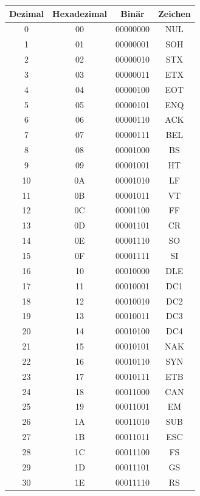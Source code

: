 \begin{table}[H]
    \centering
    \tiny
    \begin{tabular}{cccc}
        \toprule
        Dezimal & Hexadezimal & Binär & Zeichen \\
        \midrule
        0 & 00 & 00000000 & NUL \\
        1 & 01 & 00000001 & SOH \\
        2 & 02 & 00000010 & STX \\
        3 & 03 & 00000011 & ETX \\
        4 & 04 & 00000100 & EOT \\
        5 & 05 & 00000101 & ENQ \\
        6 & 06 & 00000110 & ACK \\
        7 & 07 & 00000111 & BEL \\
        8 & 08 & 00001000 & BS \\
        9 & 09 & 00001001 & HT \\
        10 & 0A & 00001010 & LF \\
        11 & 0B & 00001011 & VT \\
        12 & 0C & 00001100 & FF \\
        13 & 0D & 00001101 & CR \\
        14 & 0E & 00001110 & SO \\
        15 & 0F & 00001111 & SI \\
        16 & 10 & 00010000 & DLE \\
        17 & 11 & 00010001 & DC1 \\
        18 & 12 & 00010010 & DC2 \\
        19 & 13 & 00010011 & DC3 \\
        20 & 14 & 00010100 & DC4 \\
        21 & 15 & 00010101 & NAK \\
        22 & 16 & 00010110 & SYN \\
        23 & 17 & 00010111 & ETB \\
        24 & 18 & 00011000 & CAN \\
        25 & 19 & 00011001 & EM \\
        26 & 1A & 00011010 & SUB \\
        27 & 1B & 00011011 & ESC \\
        28 & 1C & 00011100 & FS \\
        29 & 1D & 00011101 & GS \\
        30 & 1E & 00011110 & RS \\

\end{tabular}
\end{table}
